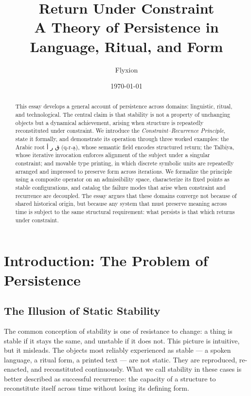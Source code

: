 \documentclass[12pt, oneside]{article}
\title{%
  \textbf{Return Under Constraint}\\[0.35em]
  {\large A Theory of Persistence in Language, Ritual, and Form}%
}
\author{Flyxion}
\date{\today}
\newcommand{\AR}[1]{\textarabic{#1}}
\theoremstyle{definition}
\theoremstyle{remark}
\begin{document}
\maketitle
\thispagestyle{empty}

\begin{abstract}
This essay develops a general account of persistence across domains: linguistic, ritual, and technological.
The central claim is that stability is not a property of unchanging objects but a dynamical achievement,
arising when structure is repeatedly reconstituted under constraint.
We introduce the \emph{Constraint--Recurrence Principle}, state it formally, and demonstrate its operation
through three worked examples: the Arabic root \AR{ق ر أ} (q-r-\d{a}), whose semantic field encodes
structured return; the Talbiya, whose iterative invocation enforces alignment of the subject under a
singular constraint; and movable type printing, in which discrete symbolic units are repeatedly arranged
and impressed to preserve form across iterations.
We formalize the principle using a composite operator on an admissibility space, characterize its fixed
points as stable configurations, and catalog the failure modes that arise when constraint and recurrence
are decoupled.
The essay argues that these domains converge not because of shared historical origin, but because any
system that must preserve meaning across time is subject to the same structural requirement:
what persists is that which returns under constraint.
\end{abstract}

\newpage
\tableofcontents
\newpage

\section{Introduction: The Problem of Persistence}

\subsection{The Illusion of Static Stability}

The common conception of stability is one of resistance to change: a thing is stable if it stays the same, and unstable if it does not.
This picture is intuitive, but it misleads.
The objects most reliably experienced as stable --- a spoken language, a ritual form, a printed text --- are not static.
They are reproduced, re-enacted, and reconstituted continuously.
What we call stability in these cases is better described as successful recurrence: the capacity of a structure to reconstitute itself across time without losing its defining form.
\end{document}
